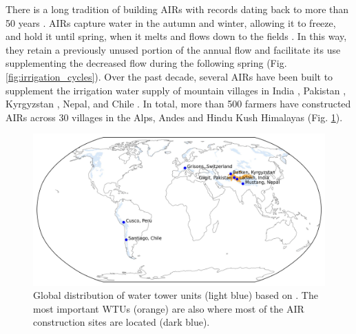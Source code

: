 There is a long tradition of building \ac{AIRs} with records dating back to more than 50 years
\citep{nusserSociohydrologyArtificialGlaciers2019}. \ac{AIRs} capture water in the autumn and winter, allowing
it to freeze, and hold it until spring, when it melts and flows down to the fields
\citep{ipccChapterHighMountain2019, vinceGlacierMan2009, clouseLadakhArtificialGlaciers2017,
nusserSociohydrologyArtificialGlaciers2019}. In this way, they retain a previously unused portion of the annual
flow and facilitate its use supplementing the decreased flow during the following spring (Fig.
\ref{fig:irrigation_cycles}). Over the past decade, several \ac{AIRs} have been built to supplement the
irrigation water supply of mountain villages in India \citep{wangchukIceStupaCompetition2020,
palmerStoringFrozenWater2022, aggarwalAdaptationClimateChange2021}, Pakistan
\citep{awazproductionIceStupaArtificial2022}, Kyrgyzstan \citep{bbcnewsBrightArtificialGlacier2020}, Nepal, and
Chile \citep{reutersConservationistsChileAim2021}. In total, more than 500 farmers have constructed AIRs across
30 villages in the Alps, Andes and Hindu Kush Himalayas (Fig. \ref{fig:WTUs_AIRs}).

\begin{figure}[htb]
	\centering
	\includegraphics[width=\textwidth]{figs/WTUs_AIRs.jpg}

	\caption{ Global distribution of water tower units (light blue) based on
		\cite{immerzeelImportanceVulnerabilityWorld2020}. The most important \ac{WTUs} (orange) are also where most of
		the AIR construction sites  are located (dark blue). }

	\label{fig:WTUs_AIRs}
\end{figure}

